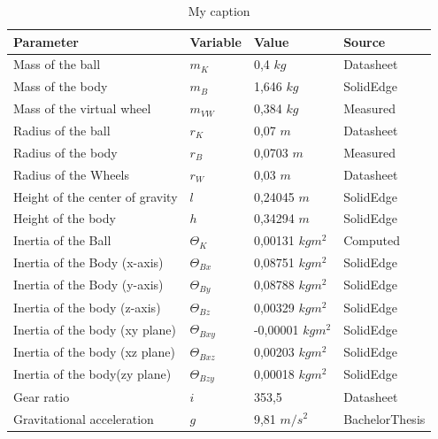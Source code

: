 \documentclass[twoside,colorback,accentcolor=tud4c,11pt]{tudreport}
\begin{document}
	
\begin{table}[]
\centering
\caption{My caption}
\label{my-label}
\begin{tabular}{|l|l|l|l|}
\hline
{ \textbf{Parameter}}        & {\textbf{Variable}} & { \textbf{Value}}               & { \textbf{Source}} \\ \hline
Mass of the ball                & $m_{K}$                & 0,4 $kg$                            & Datasheet             \\ \hline
Mass of the body                & $m_{B}$                & 1,646 $kg$                           & SolidEdge             \\ \hline
Mass of the virtual wheel       & $m_{VW}$               & 0,384 $kg$                           & Measured              \\ \hline
Radius of the ball              & $r_{K}$                & 0,07 $m$                             & Datasheet             \\ \hline
Radius of the body              & $r_{B}$                & 0,0703 $m$                           & Measured              \\ \hline
Radius of the Wheels            & $r_{W}$              & 0,03 $m$                             & Datasheet             \\ \hline
Height of the center of gravity & $l$                       & 0,24045 $m$                          & SolidEdge             \\ \hline
Height of the body              & $h$                       & 0,34294 $m$                          & SolidEdge             \\ \hline
Inertia of the Ball             & $\Theta_{K}$           & 0,00131 $kgm^{2}$  & Computed              \\ \hline
Inertia of the Body (x-axis)    & $\Theta_{Bx}$          & 0,08751 $kgm^{2}$  & SolidEdge             \\ \hline
Inertia of the Body (y-axis)    & $\Theta_{By}$          & 0,08788 $kgm^{2}$  & SolidEdge             \\ \hline
Inertia of the body (z-axis)    & $\Theta_{Bz}$          & 0,00329 $kgm^{2}$  & SolidEdge             \\ \hline
Inertia of the body (xy plane)  & $\Theta_{Bxy}$         & -0,00001 $kgm^{2}$ & SolidEdge             \\ \hline
Inertia of the body (xz plane)  & $\Theta_{Bxz}$         & 0,00203 $kgm^{2}$  & SolidEdge             \\ \hline
Inertia of the body(zy plane)   & $\Theta_{Bzy}$         & 0,00018 $kgm^{2}$  & SolidEdge             \\ \hline
Gear ratio                      & $i$                       & 353,5                              & Datasheet             \\ \hline
Gravitational acceleration      & $g$                       & 9,81 $m/s^{2}$     & BachelorThesis        \\ \hline
\end{tabular}
\end{table}
	
	
\end{document}
